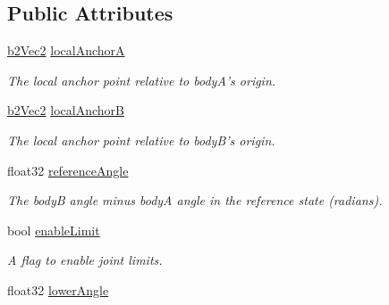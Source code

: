 \subsection*{Public Attributes}
\begin{DoxyCompactItemize}
\item 
\hypertarget{structb2_revolute_joint_def_a76337d07aa63232a7b20d50decc862ae}{\hyperlink{structb2_vec2}{b2\-Vec2} \hyperlink{structb2_revolute_joint_def_a76337d07aa63232a7b20d50decc862ae}{local\-Anchor\-A}}\label{structb2_revolute_joint_def_a76337d07aa63232a7b20d50decc862ae}

\begin{DoxyCompactList}\small\item\em The local anchor point relative to body\-A's origin. \end{DoxyCompactList}\item 
\hypertarget{structb2_revolute_joint_def_a3f33bc1d9f6c22043a5ff2f1d89f04e0}{\hyperlink{structb2_vec2}{b2\-Vec2} \hyperlink{structb2_revolute_joint_def_a3f33bc1d9f6c22043a5ff2f1d89f04e0}{local\-Anchor\-B}}\label{structb2_revolute_joint_def_a3f33bc1d9f6c22043a5ff2f1d89f04e0}

\begin{DoxyCompactList}\small\item\em The local anchor point relative to body\-B's origin. \end{DoxyCompactList}\item 
\hypertarget{structb2_revolute_joint_def_a1858d897d5fea04c5e606a1ff73f64f8}{float32 \hyperlink{structb2_revolute_joint_def_a1858d897d5fea04c5e606a1ff73f64f8}{reference\-Angle}}\label{structb2_revolute_joint_def_a1858d897d5fea04c5e606a1ff73f64f8}

\begin{DoxyCompactList}\small\item\em The body\-B angle minus body\-A angle in the reference state (radians). \end{DoxyCompactList}\item 
\hypertarget{structb2_revolute_joint_def_a2eaefc5fc5caf879cfd59ebcd852b756}{bool \hyperlink{structb2_revolute_joint_def_a2eaefc5fc5caf879cfd59ebcd852b756}{enable\-Limit}}\label{structb2_revolute_joint_def_a2eaefc5fc5caf879cfd59ebcd852b756}

\begin{DoxyCompactList}\small\item\em A flag to enable joint limits. \end{DoxyCompactList}\item 
\hypertarget{structb2_revolute_joint_def_a24d0b2638a01405c77bd1c0de3e53de8}{float32 \hyperlink{structb2_revolute_joint_def_a24d0b2638a01405c77bd1c0de3e53de8}{lower\-Angle}}\label{structb2_revolute_joint_def_a24d0b2638a01405c77bd1c0de3e53de8}


\end{DoxyCompactItemize}
